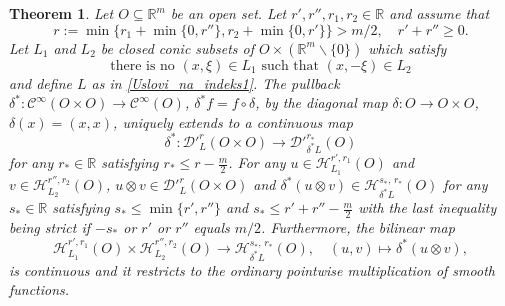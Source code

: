 \documentclass{amsart}
\newtheorem{theorem}{Theorem}[section]
\theoremstyle{definition}
\begin{document}
\begin{theorem}\label{main-the-prod-distk}
Let $O\subseteq \mathbb{R}^m$ be an open set. Let $r', r'',r_1,r_2\in \mathbb{R}$ and assume that
\begin{equation}\label{asumpton-ind-klsss}
r:=\min\{r_1+\min\{0,r''\},r_2+\min\{0,r'\}\}>m/2,\quad r'+r''\geq0.
\end{equation}
Let $L_1$ and $L_2$ be closed conic subsets of $O\times(\mathbb{R}^m\backslash\{0\})$ which satisfy
\begin{equation}
\label{uslovTe}
\text{there is no } (x,\xi)\in L_1 \text{ such that } (x,-\xi)\in L_2
\end{equation}
and define $L$ as in \eqref{Uslovi_na_indeks1}. The pullback $\delta^*:\mathcal{C}^{\infty}(O\times O)\rightarrow\mathcal{C}^{\infty}(O)$, $\delta^* f=f\circ \delta$, by the diagonal map $\delta:O\rightarrow O\times O$, $\delta(x)=(x,x)$, uniquely extends to a continuous map
\begin{equation}\label{pullback-by-diagonma}
\delta^*:\mathcal{D}'^r_L (O\times O)\rightarrow \mathcal{D}'^{r_*}_{\delta^* L}  (O)
\end{equation}
for any $r_*\in\mathbb{R}$ satisfying $r_*\leq r-\frac{m}{2}$. For any $u\in\mathscr{H}_{L_1} ^{r',r_1} (O)$ and $v\in\mathscr{H}_{L_2} ^{r'',r_2} (O)$, $u\otimes v\in \mathcal{D}'^r_L(O\times O)$ and $\delta^*(u\otimes v)\in\mathscr{H}_{\delta^* L} ^{s_*, \, r_*} (O)$ for any $s_*\in\mathbb{R}$ satisfying $s_*\leq \min\{r',r''\}$ and $s_*\leq r'+r''-\frac{m}{2}$ with the last inequality being strict if $-s_*$ or $r'$ or $r''$ equals $m/2$. Furthermore, the bilinear map
\begin{equation}\label{map-cont-pulba-mult}
\mathscr{H}_{L_1} ^{r',r_1} (O)\times\mathscr{H}_{L_2} ^{r'',r_2} (O)\rightarrow \mathscr{H}_{\delta^* L} ^{s_*, \, r_*} (O),\quad (u,v)\mapsto \delta^*(u \otimes v),
\end{equation}
is continuous and it restricts to the ordinary pointwise multiplication of smooth functions.
\end{theorem}
\end{document}
